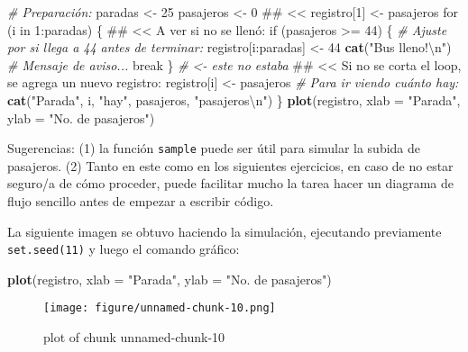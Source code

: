\documentclass[]{article}
\makeatletter
\newenvironment{Shaded}{}{}
\newcommand{\KeywordTok}[1]{\textcolor[rgb]{0.00,0.44,0.13}{\textbf{{#1}}}}
\newcommand{\DataTypeTok}[1]{\textcolor[rgb]{0.56,0.13,0.00}{{#1}}}
\newcommand{\DecValTok}[1]{\textcolor[rgb]{0.25,0.63,0.44}{{#1}}}
\newcommand{\CharTok}[1]{\textcolor[rgb]{0.25,0.44,0.63}{{#1}}}
\newcommand{\StringTok}[1]{\textcolor[rgb]{0.25,0.44,0.63}{{#1}}}
\newcommand{\CommentTok}[1]{\textcolor[rgb]{0.38,0.63,0.69}{\textit{{#1}}}}
\newcommand{\NormalTok}[1]{{#1}}
\def\maxwidth{\ifdim\Gin@nat@width>\linewidth\linewidth
\else\Gin@nat@width\fi}
\let\Oldincludegraphics\includegraphics
\renewcommand{\includegraphics}[1]{\Oldincludegraphics[width=\maxwidth]{#1}}
\makeatother
\begin{document}
\begin{Shaded}
\begin{Highlighting}[]
\CommentTok{# Preparación:}
\NormalTok{paradas <- }\DecValTok{25}
\NormalTok{pasajeros <- }\DecValTok{0}
\NormalTok{## <<}
\NormalTok{registro[}\DecValTok{1}\NormalTok{] <- pasajeros}
\NormalTok{for (i in }\DecValTok{1}\NormalTok{:paradas) \{}
    \NormalTok{## << A ver si no se llenó:}
    \NormalTok{if (pasajeros >= }\DecValTok{44}\NormalTok{) }
        \NormalTok{\{}
            \CommentTok{# Ajuste por si llega a 44 antes de terminar:}
            \NormalTok{registro[i:paradas] <- }\DecValTok{44}
            \KeywordTok{cat}\NormalTok{(}\StringTok{"Bus lleno!}\CharTok{\textbackslash{}n}\StringTok{"}\NormalTok{)  }\CommentTok{# Mensaje de aviso...}
            \NormalTok{break}
        \NormalTok{\}  }\CommentTok{# <- este no estaba}
    \NormalTok{## << Si no se corta el loop, se agrega un nuevo registro:}
    \NormalTok{registro[i] <- pasajeros}
    \CommentTok{# Para ir viendo cuánto hay:}
    \KeywordTok{cat}\NormalTok{(}\StringTok{"Parada"}\NormalTok{, i, }\StringTok{"hay"}\NormalTok{, pasajeros, }\StringTok{"pasajeros}\CharTok{\textbackslash{}n}\StringTok{"}\NormalTok{)}
\NormalTok{\}}
\KeywordTok{plot}\NormalTok{(registro, }\DataTypeTok{xlab =} \StringTok{"Parada"}\NormalTok{, }\DataTypeTok{ylab =} \StringTok{"No. de pasajeros"}\NormalTok{)}
\end{Highlighting}
\end{Shaded}
Sugerencias: (1) la función \texttt{sample} puede ser útil para simular
la subida de pasajeros. (2) Tanto en este como en los siguientes
ejercicios, en caso de no estar seguro/a de cómo proceder, puede
facilitar mucho la tarea hacer un diagrama de flujo sencillo antes de
empezar a escribir código.

La siguiente imagen se obtuvo haciendo la simulación, ejecutando
previamente \texttt{set.seed(11)} y luego el comando gráfico:

\begin{Shaded}
\begin{Highlighting}[]
\KeywordTok{plot}\NormalTok{(registro, }\DataTypeTok{xlab =} \StringTok{"Parada"}\NormalTok{, }\DataTypeTok{ylab =} \StringTok{"No. de pasajeros"}\NormalTok{)}
\end{Highlighting}
\end{Shaded}
\begin{figure}[htbp]
\centering
\texttt{[image: figure/unnamed-chunk-10.png]}
\caption{plot of chunk unnamed-chunk-10}
\end{figure}
\end{document}
